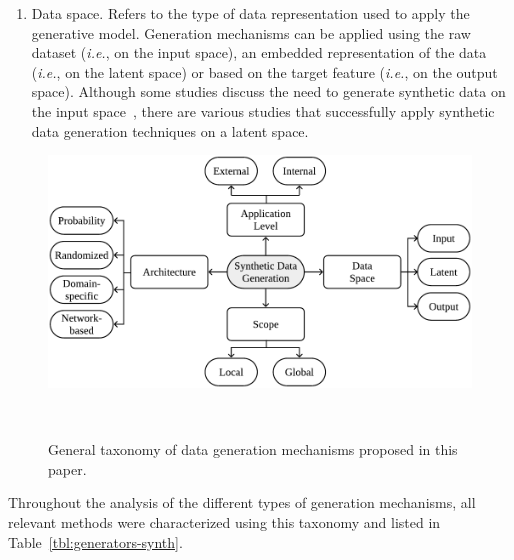 \begin{enumerate}
    \item Data space. Refers to the type of data representation used to apply
        the generative model. Generation mechanisms can be applied using the
        raw dataset (\textit{i.e.}, on the input space), an embedded
        representation of the data (\textit{i.e.}, on the latent space) or
        based on the target feature (\textit{i.e.}, on the output space).
        Although some studies discuss the need to generate synthetic data on
        the input space~\cite{dankar2021fake, patki2016synthetic}, there are
        various studies that successfully apply synthetic data generation
        techniques on a latent space.

\end{enumerate}

\begin{figure}
	\centering
	\includegraphics[width=.8\linewidth]{data-generation-taxonomy}
    \caption{General taxonomy of data generation mechanisms proposed in this
        paper.
    }~\label{fig:data-generation-taxonomy}
\end{figure}

Throughout the analysis of the different types of generation mechanisms, all
relevant methods were characterized using this taxonomy and listed in
Table~\ref{tbl:generators-synth}.

